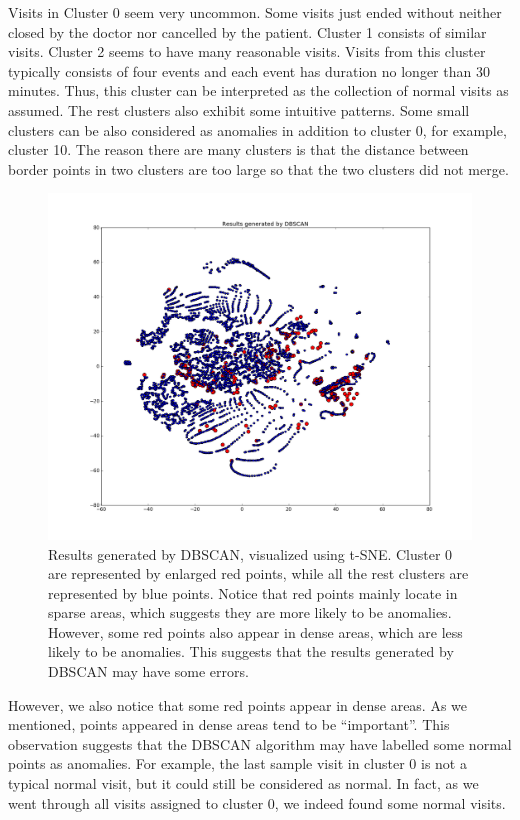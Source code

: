 Visits in Cluster 0 seem very uncommon. Some visits just ended without neither closed by the doctor nor cancelled by the patient. Cluster 1 consists of similar visits. Cluster 2 seems to have many reasonable visits. Visits from this cluster typically consists of four events and each event has duration no longer than 30 minutes. Thus, this cluster can be interpreted as the collection of normal visits as assumed. The rest clusters also exhibit some intuitive patterns. Some small clusters can be also considered as anomalies in addition to cluster 0, for example, cluster 10. The reason there are many clusters is that the distance between border points in two clusters are too large so that the two clusters did not merge. 

\begin{figure}[!ht]
	\begin{center}
		\includegraphics[width=\textwidth]{images/ClusterResult2}
		\caption{Results generated by DBSCAN, visualized using t-SNE. Cluster 0 are represented by enlarged red points, while all the rest clusters are represented by blue points. Notice that red points mainly locate in sparse areas, which suggests they are more likely to be anomalies. However, some red points also appear in dense areas, which are less likely to be anomalies. This suggests that the results generated by DBSCAN may have some errors.}
		\label{fig:ClusterResult2}
	\end{center}
\end{figure}

However, we also notice that some red points appear in dense areas. As we mentioned, points appeared in dense areas tend to be ``important''. This observation suggests that the DBSCAN algorithm may have labelled some normal points as anomalies. For example, the last sample visit in cluster 0 is not a typical normal visit, but it could still be considered as normal. In fact, as we went through all visits assigned to cluster 0, we indeed found some normal visits.

